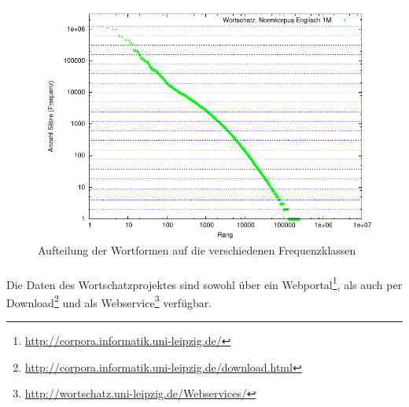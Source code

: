\begin{figure}[htb]
\includegraphics[width=1\textwidth]{img/pdf/zipf_wortschatz_frequency_class_reduced.pdf}
\caption[]{Aufteilung der Wortformen auf die verschiedenen Frequenzklassen}
\label{fig:zipf_wortschatz_frequency}
\end{figure}
\paragraph{} 
Die Daten des Wortschatzprojektes sind sowohl über ein Webportal\footnote{\url{http://corpora.informatik.uni-leipzig.de/}},
als auch per Download\footnote{\url{http://corpora.informatik.uni-leipzig.de/download.html}}
und als Webservice\footnote{\url{http://wortschatz.uni-leipzig.de/Webservices/}} verfügbar.

